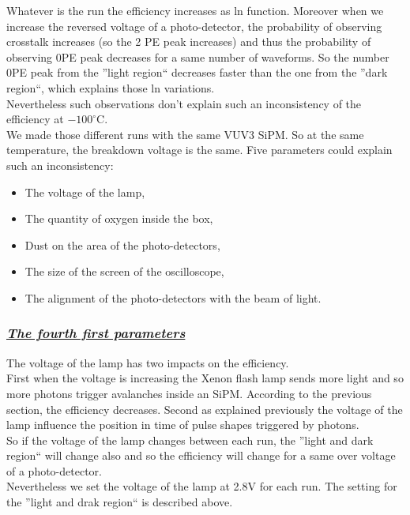 \documentclass[a4paper, 11pt]{report}%
\newcommand{\xfl}{Xenon flash lamp }
\begin{document}
  Whatever is the run the efficiency increases as ln function. Moreover when we increase the reversed voltage of a photo-detector, 
  the probability of observing crosstalk increases (so the 2 PE peak increases) and thus the probability of observing 
  0PE peak decreases for a same number of waveforms. So the number 0PE peak from the ''light region`` decreases faster than the one 
  from the ''dark region``, which explains those ln variations. 
  \\
  
  Nevertheless such observations don't explain such an inconsistency of the efficiency at $-100^{\circ}$C.\\
  We made those different runs with the same VUV3 SiPM. So at the same temperature, the breakdown voltage is the same. 
  Five parameters could explain such an inconsistency:
  
  \begin{itemize}
   \item The voltage of the lamp, 
   \item The quantity of oxygen inside the box, 
   \item Dust on the area of the photo-detectors,
   \item The size of the screen of the oscilloscope,
   \item The alignment of the photo-detectors with the beam of light.
  \end{itemize}

  \subsubsection{\textit{\underline{The fourth first parameters}}}

  The voltage of the lamp has two impacts on the efficiency.\\
  First when the voltage is increasing the \xfl sends more light and so 
  more photons trigger avalanches inside an SiPM. According to the previous section, the efficiency decreases.
  Second as explained previously the voltage of the lamp influence the position in time of pulse shapes triggered by photons.\\  
  So if the voltage of the lamp changes between each run, the ''light and dark region`` will change also and so the efficiency will change for 
  a same over voltage of a photo-detector.\\  
  Nevertheless we set the voltage of the lamp at 2.8V for each run. The setting for the ''light and drak region`` is described above.  
  \\
  
\end{document}
